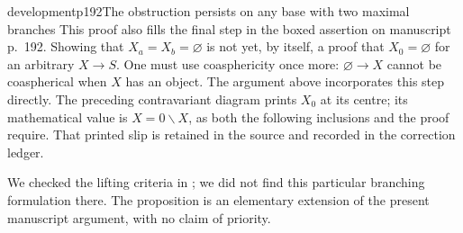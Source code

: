 \begin{dcomment}{development}{p192}{The obstruction persists on any base with two maximal branches}
This proof also fills the final step in the boxed assertion on manuscript p.~192. Showing that $X_a=X_b=\varnothing$ is not yet, by itself, a proof that $X_0=\varnothing$ for an arbitrary $X\to S$. One must use coasphericity once more: $\varnothing\to X$ cannot be coaspherical when $X$ has an object. The argument above incorporates this step directly. The preceding contravariant diagram prints $X_0$ at its centre; its mathematical value is $X=0\backslash X$, as both the following inclusions and the proof require. That printed slip is retained in the source and recorded in the correction ledger.

We checked the lifting criteria in \citet[Proposition~4.3, Theorem~4.13, and Example~4.17]{Maltsiniotis2005Asphericite}; we did not find this particular branching formulation there. The proposition is an elementary extension of the present manuscript argument, with no claim of priority.
\end{dcomment}

